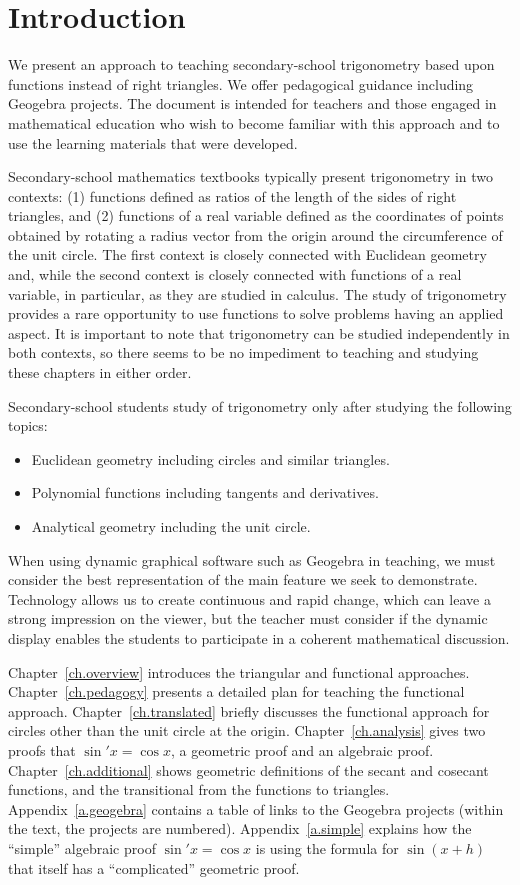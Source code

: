 \section{Introduction}

We present an approach to teaching secondary-school trigonometry based upon functions instead of right triangles.
We offer pedagogical guidance including Geogebra projects.
The document is intended for teachers and those engaged in mathematical education who wish to become familiar with this approach and to use the learning materials that were developed.

Secondary-school mathematics textbooks typically present trigonometry in two contexts: (1) functions defined as ratios of the length of the sides of right triangles, and (2) functions of a real variable defined as the coordinates of points obtained by rotating a radius vector from the origin around the circumference of the unit circle.
The first context is closely connected with Euclidean geometry and, while the second context is closely connected with functions of a real variable, in particular, as they are studied in calculus.
The study of trigonometry provides a rare opportunity to use functions to solve problems having an applied aspect.
It is important to note that trigonometry can be studied independently in both contexts, so there seems to be no impediment to teaching and studying these chapters in either order.

Secondary-school students study of trigonometry only after studying the following topics:
\begin{itemize}
\item Euclidean geometry including circles and similar triangles.
\item Polynomial functions including tangents and derivatives.
\item Analytical geometry including the unit circle.
\end{itemize}

When using dynamic graphical software such as Geogebra in teaching, we must consider the best representation of the main feature we seek to demonstrate.
Technology allows us to create continuous and rapid change, which can leave a strong impression on the viewer, but the teacher must consider if the dynamic display enables the students to participate in a coherent mathematical discussion.

Chapter~\ref{ch.overview} introduces the triangular and functional approaches. Chapter~\ref{ch.pedagogy} presents a detailed plan for teaching the functional approach. Chapter~\ref{ch.translated} briefly discusses the functional approach for circles other than the unit circle at the origin. Chapter~\ref{ch.analysis} gives two proofs that $\sin' x=\cos x$, a geometric proof and an algebraic proof. Chapter~\ref{ch.additional} shows geometric definitions of the secant and cosecant functions, and the transitional from the functions to triangles. Appendix~\ref{a.geogebra} contains a table of links to the Geogebra projects (within the text, the projects are numbered). Appendix~\ref{a.simple} explains how the ``simple'' algebraic proof $\sin' x=\cos x$ is using the formula for $\sin (x+h)$ that itself has a ``complicated'' geometric proof.
